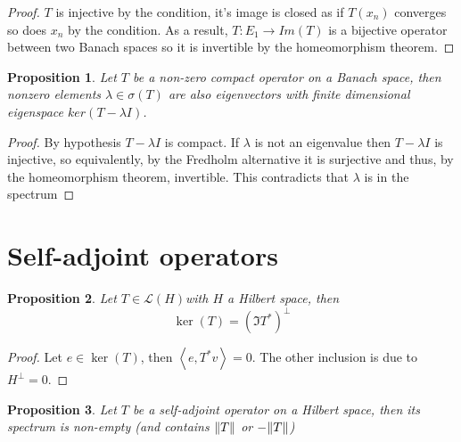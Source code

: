 \documentclass[12pt]{article}
\newcommand{\br}[1]{\left\langle#1\right\rangle}
\newtheorem{proposition}{Proposition}
\begin{document}
\begin{proof}
	$T$ is injective by the condition, it's image is closed as if $T(x_n)$ converges so does $x_n$ by the condition. As a result, $T:E_1\to Im(T)$ is a bijective operator between two Banach spaces so it is invertible by the homeomorphism theorem.
\end{proof}
\begin{proposition}
	Let $T$ be a non-zero compact operator on a Banach space, then nonzero elements $\lambda\in\sigma(T)$ are also eigenvectors with finite dimensional eigenspace $ker(T-\lambda I)$.
\end{proposition}
\begin{proof}
	By hypothesis $T-\lambda I$ is compact. If $\lambda$ is not an eigenvalue then $T-\lambda I$ is injective, so equivalently, by the Fredholm alternative it is surjective and thus, by the homeomorphism theorem, invertible. This contradicts that $\lambda$ is in the spectrum
\end{proof}
\section{Self-adjoint operators}
\begin{proposition}
	Let $T\in\mathcal{L}(H)$with $H$ a Hilbert space, then
	\begin{equation*}
		\ker(T)=(\Im T^*)^\perp
	\end{equation*}
\end{proposition}
\begin{proof}
	Let $e\in \ker(T)$, then $\br{e,T^*v}=0$. The other inclusion is due to $H^\perp =0$.
\end{proof}
\begin{proposition}
	Let $T$ be a self-adjoint operator on a Hilbert space, then its spectrum is non-empty (and contains $\norm{T}$ or $-\norm{T}$)
\end{proposition}
\end{document}
